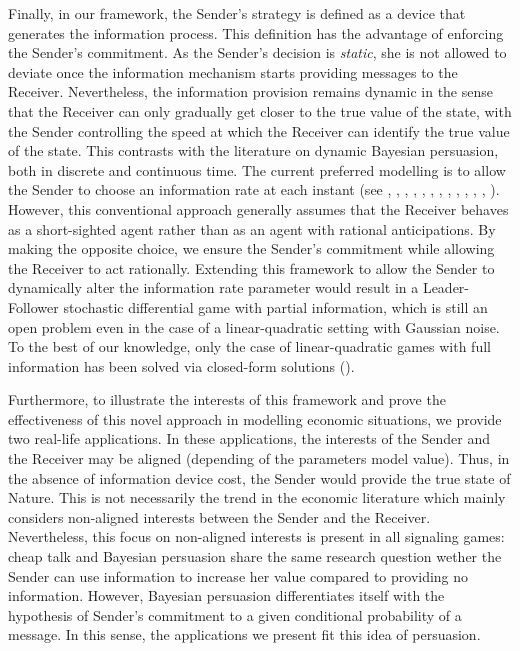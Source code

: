 \documentclass[a4paper,10pt]{article}
\theoremstyle{definition}
\theoremstyle{plain}
\numberwithin{equation}{section}
\begin{document}
Finally, in our framework, the Sender's strategy is defined as a device that generates the information process. 
This definition has the advantage of enforcing the Sender's commitment. As the Sender's decision is {\em static}, she is not allowed to deviate once the information mechanism starts providing messages to the Receiver.  Nevertheless, the information provision remains dynamic in the sense that the Receiver can only gradually get closer to the true value of the state, with the Sender controlling the speed at which the Receiver can identify the true value of the state. This contrasts with the literature on dynamic Bayesian persuasion, both in discrete and continuous time. The current preferred modelling is to allow the Sender to choose an information rate at each instant (see \cite{Renault13}, \cite{Golosov14}, \cite{Au15}, \cite{Renault17}, \cite{Ely17}, \cite{Ely19}, \cite{Orlov20}, \cite{Bizzotto21}, \cite{Liao21}, \cite{Ball23}, \cite{Che23}, \cite{Yao23}, \cite{Zhao24}). However, this conventional approach generally assumes that  the Receiver behaves as a short-sighted agent rather than as an agent with rational anticipations. By making the opposite choice, we ensure the Sender's commitment while allowing the Receiver to act rationally. Extending this framework to allow the Sender to dynamically alter the information rate parameter would result in a Leader-Follower stochastic differential game with partial information, which is still an open problem even in the case of a linear-quadratic setting with Gaussian noise. To the best of our knowledge, only the case of linear-quadratic games with full information has been solved via closed-form solutions (\cite{Bensoussan13}).

\medskip

Furthermore,  to illustrate the interests of this framework and prove the effectiveness of this novel approach in modelling economic situations, we provide two real-life applications. In these applications, the interests of the Sender and the Receiver may be aligned (depending of the parameters model value). Thus, in the absence of information device cost, the Sender would provide the true state of Nature. This is not necessarily the trend in the economic literature which mainly considers non-aligned interests between the Sender and the Receiver. Nevertheless, this focus on non-aligned interests is present in all signaling games: cheap talk and Bayesian persuasion share the same research question wether the Sender can use information to increase her value compared to providing no information. However, Bayesian persuasion differentiates itself with the hypothesis of Sender's commitment to a given conditional probability of a message. In this sense, the applications we present fit this idea of persuasion.
\end{document}
